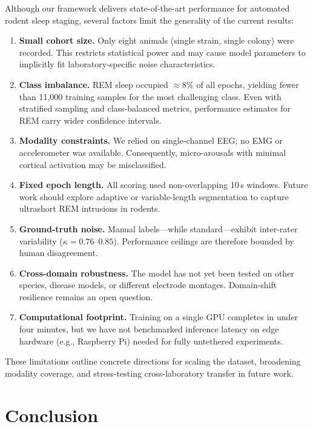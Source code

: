\documentclass[letterpaper]{article} %
\begin{document}
Although our framework delivers state-of-the-art performance for automated rodent sleep staging, several factors limit the generality of the current results:

\begin{enumerate}[nosep,leftmargin=*]
    \item \textbf{Small cohort size.} Only eight animals (single strain, single colony) were recorded. This restricts statistical power and may cause model parameters to implicitly fit laboratory-specific noise characteristics.
    \item \textbf{Class imbalance.} REM sleep occupied ${\approx}8\%$ of all epochs, yielding fewer than 11,000 training samples for the most challenging class. Even with stratified sampling and class-balanced metrics, performance estimates for REM carry wider confidence intervals.
    \item \textbf{Modality constraints.} We relied on single-channel EEG; no EMG or accelerometer was available. Consequently, micro-arousals with minimal cortical activation may be misclassified.
    \item \textbf{Fixed epoch length.} All scoring used non-overlapping 10\,s windows. Future work should explore adaptive or variable-length segmentation to capture ultrashort REM intrusions in rodents.
    \item \textbf{Ground-truth noise.} Manual labels---while standard---exhibit inter-rater variability ($\kappa = 0.76$--$0.85$). Performance ceilings are therefore bounded by human disagreement.
    \item \textbf{Cross-domain robustness.} The model has not yet been tested on other species, disease models, or different electrode montages. Domain-shift resilience remains an open question.
    \item \textbf{Computational footprint.} Training on a single GPU completes in under four minutes, but we have not benchmarked inference latency on edge hardware (e.g., Raspberry Pi) needed for fully untethered experiments.
\end{enumerate}

These limitations outline concrete directions for scaling the dataset, broadening modality coverage, and stress-testing cross-laboratory transfer in future work.

\section{Conclusion}
\end{document}

